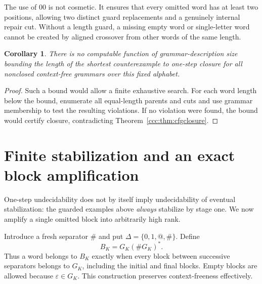 \documentclass[11pt,letterpaper]{article}
\makeatletter
\newtheorem{corollary}[theorem]{Corollary}
\theoremstyle{definition}
\theoremstyle{remark}
\newcommand{\eps}{\varepsilon}
\newcommand{\guard}{\mathtt{@}}
\newcommand{\sep}{\mathtt{\#}}
\makeatother
\begin{document}
The use of $00$ is not cosmetic. It ensures that every omitted word has at
least two positions, allowing two distinct guard replacements and a genuinely
internal repair cut. Without a length guard, a missing empty word or
single-letter word cannot be created by aligned crossover from other words
of the same length.

\begin{corollary}\label{ccc:cor:nobound}
There is no computable function of grammar-description size bounding the
length of the shortest counterexample to one-step closure for all
nonclosed context-free grammars over this fixed alphabet.
\end{corollary}
\begin{proof}
Such a bound would allow a finite exhaustive search. For each word length
below the bound, enumerate all equal-length parents and cuts and use grammar
membership to test the resulting violations. If no violation were found, the
bound would certify closure, contradicting Theorem~\ref{ccc:thm:cfgclosure}.
\end{proof}

\section{Finite stabilization and an exact block amplification}
\label{ccc:sec:amplification}

One-step undecidability does not by itself imply undecidability of eventual
stabilization: the guarded examples above \emph{always} stabilize by stage
one. We now amplify a single omitted block into arbitrarily high rank.

Introduce a fresh separator $\sep$ and put
$\Delta=\{0,1,\guard,\sep\}$. Define
\begin{equation}
 B_K=G_K(\sep G_K)^*.
 \label{ccc:eq:blocklanguage}
\end{equation}
Thus a word belongs to $B_K$ exactly when every block between successive
separators belongs to $G_K$, including the initial and final blocks.
Empty blocks are allowed because $\eps\in G_K$.
This construction preserves context-freeness effectively.
\end{document}
